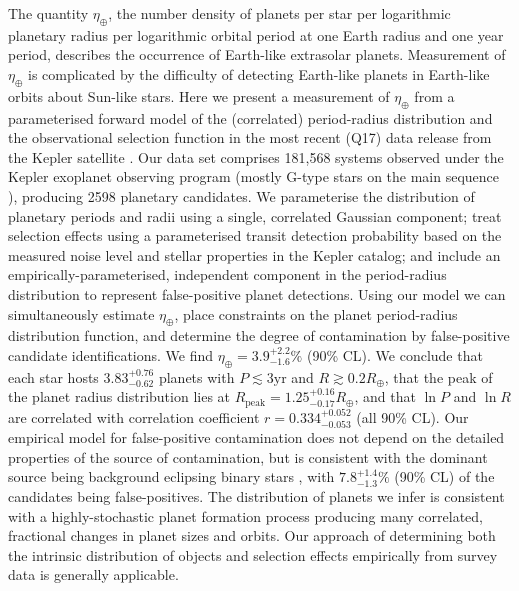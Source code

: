\documentclass[apjl]{emulateapj}
\newcommand{\etaearth}{\eta_\oplus}
\newcommand{\Rpeak}{R_\mathrm{peak}}
\newcommand{\REarth}{R_\oplus}
\newcommand{\earange}{3.9_{-1.6}^{+2.2}\%}
\newcommand{\rplrange}{3.83_{-0.62}^{+0.76}}
\newcommand{\rpeakrange}{1.25_{-0.17}^{+0.16}}
\newcommand{\corrcoeffrange}{0.334_{-0.053}^{+0.052}}
\newcommand{\fposrange}{7.8_{-1.3}^{+1.4}\%}
\begin{document}
The quantity $\etaearth$, the number density of planets per star per
logarithmic planetary radius per logarithmic orbital period at one
Earth radius and one year period, describes the occurrence of
Earth-like extrasolar planets.  Measurement of $\etaearth$ is
complicated by the difficulty of detecting Earth-like planets in
Earth-like orbits about Sun-like stars.  Here we present a measurement
of $\etaearth$ from a parameterised forward model of the (correlated)
period-radius distribution and the observational selection function in
the most recent (Q17) data release from the Kepler satellite
\citep{Borucki2010,Borucki2011,Batalha2013}.  Our data set comprises
181,568 systems observed under the Kepler exoplanet observing program
(mostly G-type stars on the main sequence \citep{Batalha2010}),
producing 2598 planetary candidates.  We parameterise the distribution
of planetary periods and radii using a single, correlated Gaussian
component; treat selection effects using a parameterised transit
detection probability based on the measured noise level and stellar
properties in the Kepler catalog; and include an
empirically-parameterised, independent component in the period-radius
distribution to represent false-positive planet detections.  Using our
model we can simultaneously estimate $\etaearth$, place constraints on
the planet period-radius distribution function, and determine the
degree of contamination by false-positive candidate identifications.
We find $\etaearth = \earange$ (90\% CL).  We conclude that each star
hosts $\rplrange$ planets with $P \lesssim 3 \mathrm{yr}$ and
$R \gtrsim 0.2 \REarth$, that the peak of the planet radius
distribution lies at $\Rpeak = \rpeakrange \REarth$, and that $\ln P$
and $\ln R$ are correlated with correlation coefficient
$r = \corrcoeffrange$ (all 90\% CL).  Our empirical model for
false-positive contamination does not depend on the detailed
properties of the source of contamination, but is consistent with the
dominant source being background eclipsing binary stars
\citep{Morton2011,Fressin2013}, with $\fposrange$ (90\% CL) of the
candidates being false-positives.  The distribution of planets we
infer is consistent with a highly-stochastic planet formation process
producing many correlated, fractional changes in planet sizes and
orbits.  Our approach of determining both the intrinsic distribution
of objects and selection effects empirically from survey data is
generally applicable.
\end{document}
